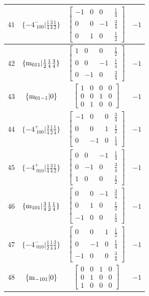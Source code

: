 \documentclass[fleqn,8pt]{jsarticle}
\begin{document}
\begin{longtable}{cccc}
$ 41 $ & $ \{-4^{-}_{\,\,100}|\frac{1}{4} \frac{3}{4} \frac{1}{2}\} $ & $ \begin{bmatrix} -1 & 0 & 0 & \frac{1}{4} \\ 0 & 0 & -1 & \frac{3}{4} \\ 0 & 1 & 0 & \frac{1}{2} \end{bmatrix} $ & $ -1 $ \\ \hline
$ 42 $ & $ \{{\rm m}_{011}|\frac{1}{2} \frac{1}{4} \frac{3}{4}\} $ & $ \begin{bmatrix} 1 & 0 & 0 & \frac{1}{2} \\ 0 & 0 & -1 & \frac{1}{4} \\ 0 & -1 & 0 & \frac{3}{4} \end{bmatrix} $ & $ -1 $ \\ \hline
$ 43 $ & $ \{{\rm m}_{01-1}|0\} $ & $ \begin{bmatrix} 1 & 0 & 0 & 0 \\ 0 & 0 & 1 & 0 \\ 0 & 1 & 0 & 0 \end{bmatrix} $ & $ -1 $ \\ \hline
$ 44 $ & $ \{-4^{+}_{\,\,100}|\frac{3}{4} \frac{1}{2} \frac{1}{4}\} $ & $ \begin{bmatrix} -1 & 0 & 0 & \frac{3}{4} \\ 0 & 0 & 1 & \frac{1}{2} \\ 0 & -1 & 0 & \frac{1}{4} \end{bmatrix} $ & $ -1 $ \\ \hline
$ 45 $ & $ \{-4^{+}_{\,\,010}|\frac{1}{4} \frac{3}{4} \frac{1}{2}\} $ & $ \begin{bmatrix} 0 & 0 & -1 & \frac{1}{4} \\ 0 & -1 & 0 & \frac{3}{4} \\ 1 & 0 & 0 & \frac{1}{2} \end{bmatrix} $ & $ -1 $ \\ \hline
$ 46 $ & $ \{{\rm m}_{101}|\frac{3}{4} \frac{1}{2} \frac{1}{4}\} $ & $ \begin{bmatrix} 0 & 0 & -1 & \frac{3}{4} \\ 0 & 1 & 0 & \frac{1}{2} \\ -1 & 0 & 0 & \frac{1}{4} \end{bmatrix} $ & $ -1 $ \\ \hline
$ 47 $ & $ \{-4^{-}_{\,\,010}|\frac{1}{2} \frac{1}{4} \frac{3}{4}\} $ & $ \begin{bmatrix} 0 & 0 & 1 & \frac{1}{2} \\ 0 & -1 & 0 & \frac{1}{4} \\ -1 & 0 & 0 & \frac{3}{4} \end{bmatrix} $ & $ -1 $ \\ \hline
$ 48 $ & $ \{{\rm m}_{-101}|0\} $ & $ \begin{bmatrix} 0 & 0 & 1 & 0 \\ 0 & 1 & 0 & 0 \\ 1 & 0 & 0 & 0 \end{bmatrix} $ & $ -1 $ \\
\end{longtable}
\end{document}
